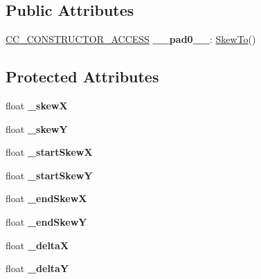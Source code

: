 \subsection*{Public Attributes}
\begin{DoxyCompactItemize}
\item 
\mbox{\label{classSkewTo_a64923b3169309e6a8e6fa91a8772016a}} 
\hyperlink{_2cocos2d_2cocos_2base_2ccConfig_8h_a25ef1314f97c35a2ed3d029b0ead6da0}{C\+C\+\_\+\+C\+O\+N\+S\+T\+R\+U\+C\+T\+O\+R\+\_\+\+A\+C\+C\+E\+SS} {\bfseries \+\_\+\+\_\+pad0\+\_\+\+\_\+}\+: \hyperlink{classSkewTo}{Skew\+To}()
\end{DoxyCompactItemize}
\subsection*{Protected Attributes}
\begin{DoxyCompactItemize}
\item 
\mbox{\label{classSkewTo_a9df199206b5ae04208f3a31e539fed79}} 
float {\bfseries \+\_\+skewX}
\item 
\mbox{\label{classSkewTo_a5adb31e0aedcd53be96630373ce38f18}} 
float {\bfseries \+\_\+skewY}
\item 
\mbox{\label{classSkewTo_a0151995972c3e1919f9ce6483dc1777e}} 
float {\bfseries \+\_\+start\+SkewX}
\item 
\mbox{\label{classSkewTo_a12317afcce4f1b42aae9e4ee64d61202}} 
float {\bfseries \+\_\+start\+SkewY}
\item 
\mbox{\label{classSkewTo_a6705074be9f91e2ed4b9f2949bc68f45}} 
float {\bfseries \+\_\+end\+SkewX}
\item 
\mbox{\label{classSkewTo_a39419dde7110f56220b0a58cd7ab6bbe}} 
float {\bfseries \+\_\+end\+SkewY}
\item 
\mbox{\label{classSkewTo_a28a7a731060ca59141032efaeebc2523}} 
float {\bfseries \+\_\+deltaX}
\item 
\mbox{\label{classSkewTo_a02dddf5131b638f5c5f420668b9c701e}} 
float {\bfseries \+\_\+deltaY}
\end{DoxyCompactItemize}
